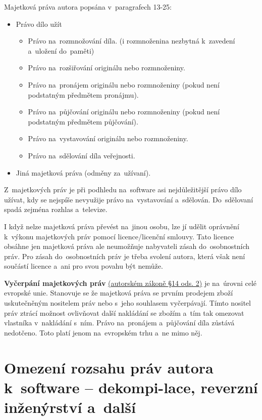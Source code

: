 Majetková práva autora popsána v~paragrafech 13-25:
\begin{itemize} 
	\item Právo dílo užít
	\begin{itemize} 
		\item Právo na~rozmnožování díla. (i rozmnoženina nezbytná k~zavedení a~uložení do~paměti)
		\item Právo na~rozšiřování originálu nebo rozmnoženiny.
		\item Právo na~pronájem originálu nebo rozmnoženiny (pokud není podstatným předmětem pronájmu).
		\item Právo na~půjčování originálu nebo rozmnoženiny (pokud není podstatným předmětem půjčování).
		\item Právo na~vystavování originálu nebo rozmnoženiny.
		\item Právo na~sdělování díla veřejnosti.
	\end{itemize}
	\item Jiná majetková práva (odměny za~užívaní).
\end{itemize}

Z~majetkových práv je při podhledu na~software asi nejdůležitější právo dílo užívat, kdy se nejspíše nevyužije právo na~vystavování a~sdělován. Do~sdělovaní spadá zejména rozhlas a~televize.

I když nelze majetková práva převést na~jinou osobu, lze jí udělit oprávnění k~výkonu majetkových práv pomocí licence/licenční smlouvy. Tato licence obsáhne jen majetková práva ale neumožňuje nabyvateli zásah do~osobnostních práv. Pro zásah do~osobnostních práv je třeba svolení autora, která však není součástí licence a~ani pro svou povahu být nemůže. 

\textbf{Vyčerpání majetkových práv} \href{https://www.zakonyprolidi.cz/cs/2000-121#p14-2}{(autorském zákoně §14 ods. 2)} je na~úrovni celé evropské unie. Stanovuje se že majetková práva se prvním prodejem zboží uskutečněným nositelem práv nebo s~jeho souhlasem vyčerpávají. Tímto nositel práv ztrácí možnost ovlivňovat další nakládání se zbožím a~tím tak omezovat vlastníka v~nakládání s~ním. Právo na~pronájem a~půjčování díla zůstává nedotčeno. Toto platí jenom na~evropském trhu a~ne mimo něj.










\clearpage
\section[Omezení rozsahu práv autora k~software -- dekompilace, reverzní inženýrství a~další]{Omezení rozsahu práv autora k~software -- dekompi-lace, reverzní inženýrství a~další}

